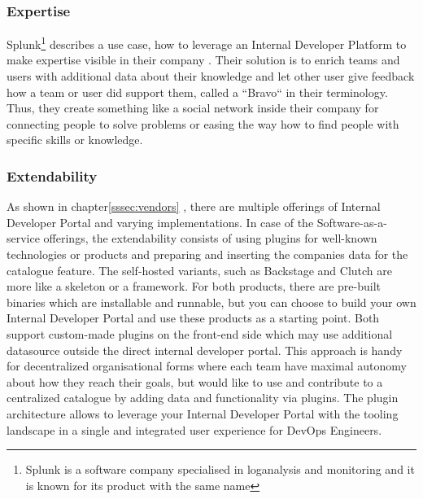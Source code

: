 \documentclass[a4paper,12pt]{article}
\begin{document}
    \subsubsection{Expertise}
    Splunk\footnote{Splunk is a software company specialised in loganalysis and monitoring and it is known for its product with the same name}
    describes a use case, how to leverage an Internal Developer Platform to make expertise visible in their
    company\parencite{splunkidp} .
    Their solution is to enrich teams and users with additional data about their knowledge and let other user give feedback
    how a team or user did support them, called a ``Bravo`` in their terminology.
    Thus, they create something like a social network inside their company for connecting people to solve problems or
    easing the way how to find people with specific skills or knowledge.

    \subsubsection{Extendability}
    As shown in chapter\ref{sssec:vendors} , there are multiple offerings of Internal Developer Portal and varying
    implementations.
    In case of the Software-as-a-service offerings, the extendability consists of using plugins for well-known
    technologies or products and preparing and inserting the companies data for the catalogue feature.
    The self-hosted variants, such as Backstage and Clutch are more like a skeleton or a framework.
    For both products, there are pre-built binaries which are installable and runnable, but you can choose to build your
    own Internal Developer Portal and use these products as a starting point.
    Both support custom-made plugins on the front-end side which may use additional datasource outside the direct
    internal developer portal.
    This approach is handy for decentralized organisational forms where each team have maximal autonomy about how they
    reach their goals, but would like to use and contribute to a centralized catalogue by adding data and functionality
    via plugins.
    The plugin architecture allows to leverage your Internal Developer Portal with the tooling landscape in a
    single and integrated user experience for DevOps Engineers.
    \pagebreak
\end{document}
